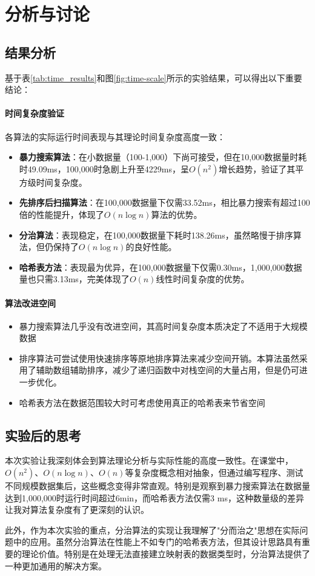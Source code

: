 \documentclass[UTF8,12pt,a4paper]{ctexart}
\begin{document}
\section{分析与讨论}

\subsection{结果分析}
基于表\ref{tab:time_results}和图\ref{fig:time-scale}所示的实验结果，可以得出以下重要结论：

\paragraph{时间复杂度验证}
各算法的实际运行时间表现与其理论时间复杂度高度一致：
\begin{itemize}
    \item \textbf{暴力搜索算法}：在小数据量（100-1,000）下尚可接受，但在10,000数据量时耗时49.09ms，100,000时急剧上升至4229ms，呈$O(n^2)$增长趋势，验证了其平方级时间复杂度。
    \item \textbf{先排序后扫描算法}：在100,000数据量下仅需33.52ms，相比暴力搜索有超过100倍的性能提升，体现了$O(n\log n)$算法的优势。
    \item \textbf{分治算法}：表现稳定，在100,000数据量下耗时138.26ms，虽然略慢于排序算法，但仍保持了$O(n\log n)$的良好性能。
    \item \textbf{哈希表方法}：表现最为优异，在100,000数据量下仅需0.30ms，1,000,000数据量也只需3.13ms，完美体现了$O(n)$线性时间复杂度的优势。
\end{itemize}

\paragraph{算法改进空间}
\begin{itemize}
    \item 暴力搜索算法几乎没有改进空间，其高时间复杂度本质决定了不适用于大规模数据
    \item 排序算法可尝试使用快速排序等原地排序算法来减少空间开销。本算法虽然采用了辅助数组辅助排序，减少了递归函数中对栈空间的大量占用，但是仍可进一步优化。
    \item 哈希表方法在数据范围较大时可考虑使用真正的哈希表来节省空间
\end{itemize}

\subsection{实验后的思考}

本次实验让我深刻体会到算法理论分析与实际性能的高度一致性。在课堂中，$O(n^2)$、$O(n\log n)$、$O(n)$等复杂度概念相对抽象，但通过编写程序、测试不同规模数据集后，这些概念变得非常直观。特别是观察到暴力搜索算法在数据量达到1,000,000时运行时间超过6min，而哈希表方法仅需3 ms，这种数量级的差异让我对算法复杂度有了更深刻的认识。

此外，作为本次实验的重点，分治算法的实现让我理解了"分而治之"思想在实际问题中的应用。虽然分治算法在性能上不如专门的哈希表方法，但其设计思路具有重要的理论价值。特别是在处理无法直接建立映射表的数据类型时，分治算法提供了一种更加通用的解决方案。


% 
\end{document}
